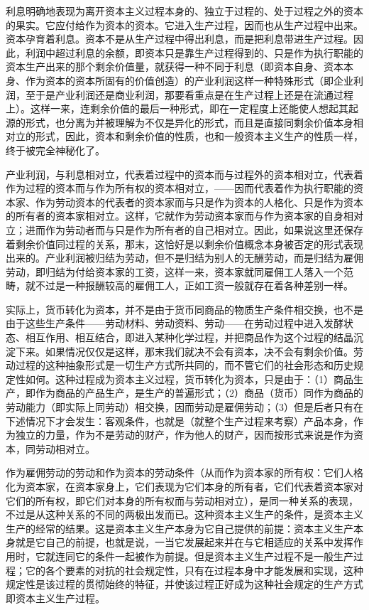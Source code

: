 利息明确地表现为离开资本主义过程本身的、独立于过程的、处于过程之外的资本的果实。它应付给作为资本的资本。它进入生产过程，因而也从生产过程中出来。资本孕育着利息。资本不是从生产过程中得出利息，而是把利息带进生产过程。因此，利润中超过利息的余额，即资本只是靠生产过程得到的、只是作为执行职能的资本生产出来的那个剩余价值量，就获得一种不同于利息（即资本自身、资本本身、作为资本的资本所固有的价值创造）的产业利润这样一种特殊形式（即企业利润，至于是产业利润还是商业利润，那要看重点是在生产过程上还是在流通过程上）。这样一来，连剩余价值的最后一种形式，即在一定程度上还能使人想起其起源的形式，也分离为并被理解为不仅是异化的形式，而且是直接同剩余价值本身相对立的形式，因此，资本和剩余价值的性质，也和一般资本主义生产的性质一样，终于被完全神秘化了。

产业利润，与利息相对立，代表着过程中的资本而与过程外的资本相对立，代表着作为过程的资本而与作为所有权的资本相对立，——因而代表着作为执行职能的资本家、作为劳动资本的代表者的资本家而与只是作为资本的人格化、只是作为资本的所有者的资本家相对立。这样，它就作为劳动资本家而与作为资本家的自身相对立；进而作为劳动者而与只是作为所有者的自己相对立。因此，如果说这里还保存着剩余价值同过程的关系，那末，这恰好是以剩余价值概念本身被否定的形式表现出来的。产业利润被归结为劳动，但不是归结为别人的无酬劳动，而是归结为雇佣劳动，即归结为付给资本家的工资，这样一来，资本家就同雇佣工人落入一个范畴，就不过是一种报酬较高的雇佣工人，正如工资一般就存在着各种差别一样。

实际上，货币转化为资本，并不是由于货币同商品的物质生产条件相交换，也不是由于这些生产条件——劳动材料、劳动资料、劳动——在劳动过程中进入发酵状态、相互作用、相互结合，即进入某种化学过程，并把商品作为这个过程的结晶沉淀下来。如果情况仅仅是这样，那末我们就决不会有资本，决不会有剩余价值。劳动过程的这种抽象形式是一切生产方式所共同的，而不管它们的社会形态和历史规定性如何。这种过程成为资本主义过程，货币转化为资本，只是由于：（1）商品生产，即作为商品的产品生产，是生产的普遍形式；（2）商品（货币）同作为商品的劳动能力（即实际上同劳动）相交换，因而劳动是雇佣劳动；（3）但是后者只有在下述情况下才会发生：客观条件，也就是（就整个生产过程来考察）产品本身，作为独立的力量，作为不是劳动的财产，作为他人的财产，因而按形式来说是作为资本，同劳动相对立。

作为雇佣劳动的劳动和作为资本的劳动条件（从而作为资本家的所有权：它们人格化为资本家，在资本家身上，它们表现为它们本身的所有者，它们代表着资本家对它们的所有权，即它们对本身的所有权而与劳动相对立），是同一种关系的表现，不过是从这种关系的不同的两极出发而已。这种资本主义生产的条件，是资本主义生产的经常的结果。这是资本主义生产本身为它自己提供的前提：资本主义生产本身就是它自己的前提，也就是说，一当它发展起来并在与它相适应的关系中发挥作用时，它就连同它的条件一起被作为前提。但是资本主义生产过程不是一般生产过程；它的各个要素的对抗的社会规定性，只有在过程本身中才能发展和实现，这种规定性是该过程的贯彻始终的特征，并使该过程正好成为这种社会规定的生产方式即资本主义生产过程。

